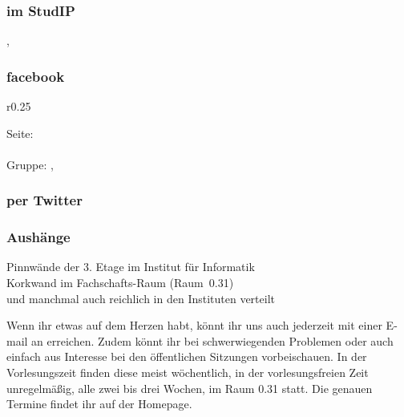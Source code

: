 \subsubsection{im StudIP}
    , \\ 
\subsubsection{facebook}
\begin{wrapfigure}{r}{0.25\textwidth}\centering
\end{wrapfigure}
    Seite:  \\
     \\
    Gruppe: ,\\ \phantom{Gruppe:} 
\subsubsection{per Twitter}
\subsubsection{Aushänge}
    Pinnwände der 3. Etage im Institut für Informatik \\
    Korkwand im Fachschafts-Raum (Raum~0.31) \\
    und manchmal auch reichlich in den Instituten verteilt

Wenn ihr etwas auf dem Herzen habt, könnt ihr uns auch jederzeit mit einer E-mail an  erreichen.
Zudem könnt ihr bei schwerwiegenden Problemen oder auch einfach aus Interesse bei den öffentlichen Sitzungen vorbeischauen.
In der Vorlesungszeit finden diese meist wöchentlich, in der vorlesungsfreien Zeit unregelmäßig, alle zwei bis drei Wochen, im Raum 0.31 statt.
Die genauen Termine findet ihr auf der Homepage.



